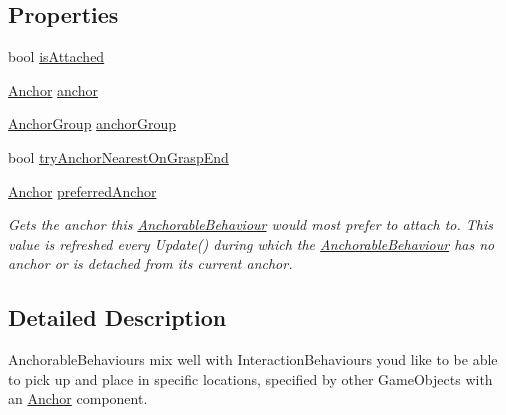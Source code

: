 \subsection*{Properties}
\begin{DoxyCompactItemize}
\item 
bool \mbox{\hyperlink{class_leap_1_1_unity_1_1_interaction_1_1_anchorable_behaviour_ad44eb15001e88b33e46f06e1b2501e59}{is\+Attached}}
\item 
\mbox{\hyperlink{class_leap_1_1_unity_1_1_interaction_1_1_anchor}{Anchor}} \mbox{\hyperlink{class_leap_1_1_unity_1_1_interaction_1_1_anchorable_behaviour_acc535c0d9a79d1ddcaab2dd0587ba9bb}{anchor}}
\item 
\mbox{\hyperlink{class_leap_1_1_unity_1_1_interaction_1_1_anchor_group}{Anchor\+Group}} \mbox{\hyperlink{class_leap_1_1_unity_1_1_interaction_1_1_anchorable_behaviour_a493657fd562e747009c5536592f30e7a}{anchor\+Group}}
\item 
bool \mbox{\hyperlink{class_leap_1_1_unity_1_1_interaction_1_1_anchorable_behaviour_aaa63f2fc2253c8a559150fb0127730f5}{try\+Anchor\+Nearest\+On\+Grasp\+End}}
\item 
\mbox{\hyperlink{class_leap_1_1_unity_1_1_interaction_1_1_anchor}{Anchor}} \mbox{\hyperlink{class_leap_1_1_unity_1_1_interaction_1_1_anchorable_behaviour_ab82e05ed50e6b2de8cad02a53efec6d4}{preferred\+Anchor}}
\begin{DoxyCompactList}\small\item\em Gets the anchor this \mbox{\hyperlink{class_leap_1_1_unity_1_1_interaction_1_1_anchorable_behaviour}{Anchorable\+Behaviour}} would most prefer to attach to. This value is refreshed every Update() during which the \mbox{\hyperlink{class_leap_1_1_unity_1_1_interaction_1_1_anchorable_behaviour}{Anchorable\+Behaviour}} has no anchor or is detached from its current anchor. \end{DoxyCompactList}\end{DoxyCompactItemize}


\subsection{Detailed Description}
Anchorable\+Behaviours mix well with Interaction\+Behaviours you\textquotesingle{}d like to be able to pick up and place in specific locations, specified by other Game\+Objects with an \mbox{\hyperlink{class_leap_1_1_unity_1_1_interaction_1_1_anchor}{Anchor}} component. 



